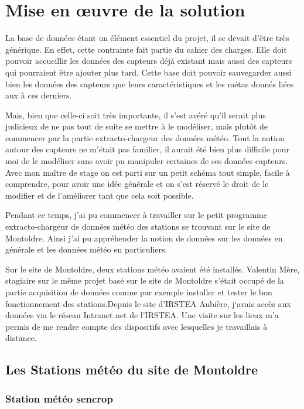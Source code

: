 \section{Mise en œuvre de la solution} 

La base de données étant un élément essentiel du projet, il se devait d’être très générique. En effet, cette contrainte fait partie du cahier des charges. Elle doit pouvoir accueillir les données des capteurs déjà existant mais aussi des capteurs qui pourraient être ajouter plus tard. Cette base doit pouvoir sauvegarder aussi bien les données des capteurs que leurs caractéristiques et les métas donnés liées aux à ces derniers. 

Mais, bien que celle-ci soit très importante, il s’est avéré qu’il serait plus judicieux de ne pas tout de suite se mettre à le modéliser, mais plutôt de commencer par la partie extracto-chargeur des données météo. Tout la notion autour des capteurs ne m’était pas familier, il aurait été bien plus difficile pour moi de le modéliser sans avoir pu manipuler certaines de ses données capteurs. Avec mon maître de stage on est parti sur un petit schéma tout simple, facile à comprendre, pour avoir une idée générale et on s’est réservé le droit de le modifier et de l’améliorer tant que cela soit possible. 

Pendant ce temps, j’ai pu commencer à travailler sur le petit programme extracto-chargeur de données météo des stations se trouvant sur le site de Montoldre. Ainsi j’ai pu appréhender la notion de données sur les données en générale et les données météo en particuliers.  

 
Sur le site de Montoldre, deux stations météo avaient été installés. Valentin Mère, stagiaire sur le même projet basé sur le site de Montoldre s’était occupé de la partie acquisition de données comme par exemple installer et tester le bon fonctionnement des stations.Depuis le site d’IRSTEA Aubière, j‘avais accès aux données via le réseau Intranet net de l’IRSTEA. Une visite sur les lieux m’a permis de me rendre compte des dispositifs avec lesquelles je travaillais à distance.  

\subsection{Les Stations météo du site de Montoldre} 

\subsubsection{Station météo sencrop}

